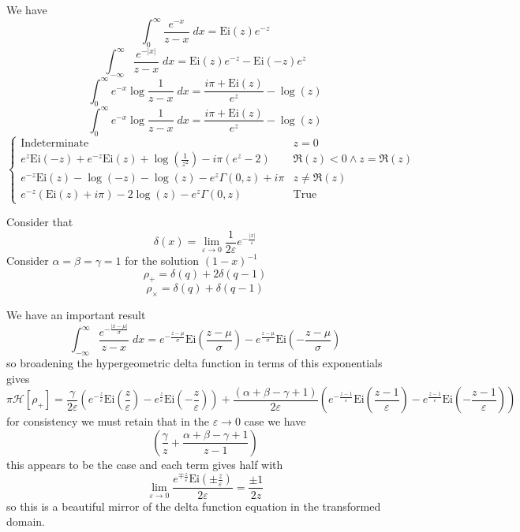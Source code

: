 \documentclass{article}
\begin{document}
We have 
$$
\int_0^\infty \frac{e^{-x}}{z-x} \; dx = \mathrm{Ei}(z)e^{-z}
$$
$$
\int_{-\infty}^\infty \frac{e^{-|x|}}{z-x} \; dx = \mathrm{Ei}(z)e^{-z} - \mathrm{Ei}(-z)e^z
$$
$$
\int_0^\infty e^{-x} \log\frac{1}{z-x} \; dx = \frac{i\pi+\mathrm{Ei}(z)}{e^{z}} - \log(z)
$$
$$
\int_0^\infty e^{-x} \log\frac{1}{z-x} \; dx = \frac{i\pi+\mathrm{Ei}(z)}{e^{z}} - \log(z)
$$
$$
\begin{cases}
                    \text{Indeterminate} & z=0 \\
                    e^z \text{Ei}(-z)+e^{-z} \text{Ei}(z)+\log \left(\frac{1}{z^2}\right)-i \pi  \left(e^z-2\right) & \Re(z)<0\land z=\Re(z) \\
                    e^{-z} \text{Ei}(z)-\log (-z)-\log (z)-e^z \Gamma (0,z)+i \pi  & z\neq \Re(z) \\
                    e^{-z} (\text{Ei}(z)+i \pi )-2 \log (z)-e^z \Gamma (0,z) & \text{True}
                   \end{cases}
$$

Consider that 
$$
\delta(x) = \lim_{\varepsilon \to 0} \frac{1}{2 \varepsilon}e^{-\frac{|x|}{\varepsilon}}
$$
Consider $\alpha=\beta=\gamma=1$ for the solution $(1-x)^{-1}$
$$
\rho_+ = \delta(q) + 2 \delta(q-1)
$$
$$
\rho_\times = \delta(q) + \delta(q-1)
$$


We have an important result
$$
\int_{-\infty}^\infty \frac{e^{-\frac{|x-\mu|}{\sigma}}}{z-x} \; dx = e^{-\frac{z-\mu}{\sigma}} \text{Ei}\left(\frac{z-\mu}{\sigma}\right)-e^{\frac{z-\mu}{\sigma}} \text{Ei}\left(-\frac{z-\mu}{\sigma}\right)
$$
so broadening the hypergeometric delta function in terms of this exponentials gives 
$$
\pi \mathcal{H}[\rho_+] = \frac{\gamma}{2 \varepsilon}\left(e^{-\frac{z}{\varepsilon}} \text{Ei}\left(\frac{z}{\varepsilon}\right)-e^{\frac{z}{\varepsilon}} \text{Ei}\left(-\frac{z}{\varepsilon}\right)\right) + \frac{(\alpha+\beta-\gamma+1)}{2 \varepsilon} \left( e^{-\frac{z-1}{\varepsilon}} \text{Ei}\left(\frac{z-1}{\varepsilon}\right)-e^{\frac{z-1}{\varepsilon}} \text{Ei}\left(-\frac{z-1}{\varepsilon}\right) \right)
$$
for consistency we must retain that in the $\varepsilon \to 0$ case we have
$$
\left(\frac{\gamma}{z} + \frac{\alpha+\beta-\gamma+1}{z-1} \right)
$$
this appears to be the case and each term gives half with 
$$
\lim_{\varepsilon\to 0} \frac{e^{\mp\frac{z}{\varepsilon}} \textrm{Ei}\left(\pm\frac{z}{\varepsilon}\right)}{2 \varepsilon} = \frac{\pm 1}{2z}
$$
so this is a beautiful mirror of the delta function equation in the transformed domain.
\end{document}
